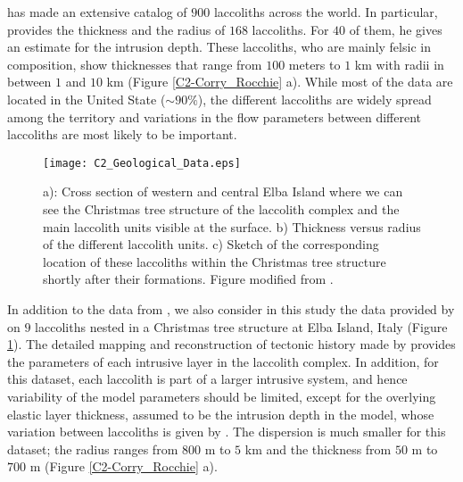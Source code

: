 \citet{E:2015tl}  has made  an extensive  catalog of  $900$ laccoliths
across  the  world.   In  particular,  \citet{E:2015tl}  provides  the
thickness and  the radius of $168$  laccoliths.  For $40$ of  them, he
gives an estimate for the  intrusion depth.  These laccoliths, who are
mainly felsic in  composition, show thicknesses that  range from $100$
meters  to $1$  km  with radii  in  between $1$  and  $10$ km  (Figure
\ref{C2-Corry_Rocchie} a).  While most of  the data are located in the
United State ($\sim 90\%$), the different laccoliths are widely spread
among  the territory  and variations  in the  flow parameters  between
different laccoliths are most likely to be important.
\begin{figure}[h!]
  \begin{center}
    \graphicspath{ {/Users/thorey/Documents/These/Manuscript/Figure/Chapter2/} }
    \texttt{[image: C2\_Geological\_Data.eps]}
    \caption{a):  Cross section  of  western and  central Elba  Island
      where we can  see the Christmas tree structure  of the laccolith
      complex and the main laccolith  units visible at the surface. b)
      Thickness  versus radius  of the  different laccolith  units. c)
      Sketch of the corresponding  location of these laccoliths within
      the    Christmas   tree    structure    shortly   after    their
      formations. Figure modified from \citet{Rocchi:2002jy}.}
    \label{C2_Geological_Data}
  \end{center}
\end{figure}

In addition  to the  data from \citet{E:2015tl},  we also  consider in
this  study   the  data  provided  by   \citet{Rocchi:2002jy}  on  $9$
laccoliths nested in a Christmas  tree structure at Elba Island, Italy
(Figure   \ref{C2_Geological_Data}).    The   detailed   mapping   and
reconstruction  of  tectonic  history  made  by  \citet{Rocchi:2002jy}
provides  the parameters  of  each intrusive  layer  in the  laccolith
complex. In  addition, for this dataset,  each laccolith is part  of a
larger intrusive system, and hence variability of the model parameters
should be limited,  except for the overlying  elastic layer thickness,
assumed  to be  the  intrusion  depth in  the  model, whose  variation
between laccoliths is given  by \citet{Rocchi:2002jy}.  The dispersion
is much  smaller for this dataset;  the radius ranges from  $800$ m to
$5$  km   and  the  thickness   from  $50$   m  to  $700$   m  (Figure
\ref{C2-Corry_Rocchie} a).

